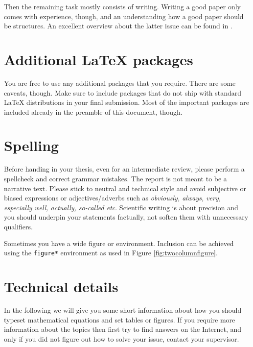 \documentclass[10pt,a4paper,twoside,journal]{IEEEtran}
\begin{document}
Then the remaining task mostly consists of writing. Writing a good paper only
comes with experience, though, and an understanding how a good paper should be
structures. An excellent overview about the latter issue can be found in
\cite{katzoff1964}.

\section{Additional \LaTeX{} packages}

You are free to use any additional packages that you require. There are some
caveats, though. Make sure to include packages that do not ship with standard
\LaTeX{} distributions in your final submission. Most of the important packages
are included already in the preamble of this document, though.


\section{Spelling}

Before handing in your thesis, even for an intermediate review, please perform a
spellcheck and correct grammar mistakes. The report is not meant to be a
narrative text. Please stick to neutral and technical style and avoid subjective
or biased expressions or adjectives/adverbs such as \emph{obviously, always,
very, especially well, actually, so-called etc}. Scientific writing is about
precision and you should underpin your statements factually, not soften them
with unnecessary qualifiers.

Sometimes you have a wide figure or environment. Inclusion can be achieved using
the \texttt{figure*} environment as used in Figure \ref{fig:twocolumnfigure}.
\begin{figure*}
	\centering
	\fbox{\rule{0pt}{2cm} \rule{1.0\linewidth}{0pt}}
	\caption{A wide figure.}
	\label{fig:twocolumnfigure}
\end{figure*}

\section{Technical details}

In the following we will give you some short information about how you should
typeset mathematical equations and set tables or figures. If you require more
information about the topics then first try to find answers on the Internet, and
only if you did not figure out how to solve your issue, contact your supervisor.
\end{document}
